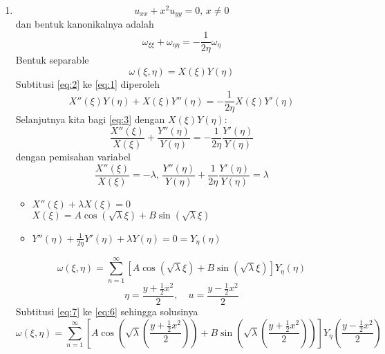 \documentclass[a4paper]{article}
\theoremstyle{definition}
\begin{document}
\pagestyle{fancy}
\begin{enumerate}
  \item \[u_{xx} + x^2u_{yy} = 0,\, x\ne 0\]
  dan bentuk kanonikalnya adalah
  \begin{equation}
    \omega_{\xi\xi} + \omega_{\eta\eta} = -\frac{1}{2\eta}\omega_{\eta}\label{eq:1}
  \end{equation}
  Bentuk separable 
  \begin{equation}
    \omega(\xi,\eta) = X(\xi)Y(\eta)\label{eq:2}
  \end{equation}
  Subtitusi \eqref{eq:2} ke \eqref{eq:1} diperoleh
  \begin{equation}
    X''(\xi)Y(\eta) + X(\xi)Y''(\eta) = -\frac{1}{2\eta}X(\xi)Y'(\eta)\label{eq:3}
  \end{equation}
  Selanjutnya kita bagi \eqref{eq:3} dengan $X(\xi)Y(\eta)$:
  \begin{equation}
    \frac{X''(\xi)}{X(\xi)} + \frac{Y''(\eta)}{Y(\eta)} = -\frac{1}{2\eta}\frac{Y'(\eta)}{Y(\eta)}\label{eq:4}
  \end{equation}
  dengan pemisahan variabel
  \begin{equation}
    \frac{X''(\xi)}{X(\xi)} = -\lambda,\, \frac{Y''(\eta)}{Y(\eta)} + \frac{1}{2\eta}\frac{Y'(\eta)}{Y(\eta)} = \lambda\label{eq:5}
  \end{equation}
  \begin{itemize}
    \item $X''(\xi) + \lambda X(\xi) = 0$\\
    $X(\xi) = A\cos(\sqrt{\lambda}\xi) + B\sin(\sqrt{\lambda}\xi)$
    \item $Y''(\eta) + \frac{1}{2\eta}Y'(\eta) + \lambda Y(\eta) = 0 = Y_\eta(\eta)$
  \end{itemize}
  \begin{equation}
    \omega(\xi,\eta) = \sum_{n=1}^{\infty}\left[A\cos(\sqrt{\lambda}\xi) + B\sin(\sqrt{\lambda}\xi)\right]Y_\eta(\eta) \label{eq:6}
  \end{equation}
  \begin{equation}
      \eta = \frac{y+\frac{1}{2}x^2}{2},\quad u = \frac{y-\frac{1}{2}x^2}{2}\label{eq:7}
  \end{equation}
  Subtitusi \eqref{eq:7} ke \eqref{eq:6} sehingga solusinya
  \begin{equation*}
      \omega(\xi,\eta) = \sum_{n=1}^{\infty}\left[A\cos\left(\sqrt{\lambda}\left(\frac{y+\frac{1}{2}x^2}{2}\right)\right) + B\sin\left(\sqrt{\lambda}\left(\frac{y+\frac{1}{2}x^2}{2}\right)\right)\right]Y_\eta\left(\frac{y-\frac{1}{2}x^2}{2}\right)

\end{equation*}
\end{enumerate}
\end{document}
